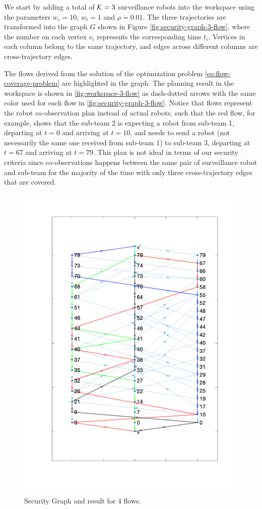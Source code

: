 \documentclass[journal]{IEEEtran}  %
\begin{document}
We start by adding a total of $\mathcal{K}=3$ surveillance robots into the workspace using the parameters $w_{c}=10$, $w_{t}=1$ and $\rho = 0.01$. The three trajectories are transformed into the graph $G$ shown in Figure \ref{fig:security-graph-3-flow}, where the number on each vertex $v_{i}$ represents the corresponding time $t_{i}$. Vertices in each column belong to the same trajectory, and edges across different columns are cross-trajectory edges. 

The flows derived from the solution of the optimization problem \eqref{eq:flow-coverage-problem} are highlighted in the graph. The planning result in the workspace is shown in \ref{fig:workspace-3-flow} as dash-dotted arrows with the same color used for each flow in \ref{fig:security-graph-3-flow}. Notice that flows represent the robot co-observation plan instead of actual robots, such that the red flow, for example, shows that the sub-team 2 is expecting a robot from sub-team 1, departing at $t=0$ and arriving at $t=10$, and needs to send a robot (not necessarily the same one received from sub-team 1) to sub-team 3, departing at $t=67$ and arriving at $t=79$. This plan is not ideal in terms of our security criteria since co-observations happens between the same pair of surveillance robot and sub-team for the majority of the time with only three cross-trajectory edges that are covered.

\begin{figure}[t]
\begin{center}
\includegraphics[width=0.4\linewidth]{graph_flow_result_4}
\caption{Security Graph and result for 4 flows.}
\label{fig:security-graph-4-flow}
\end{center}
\end{figure}
\end{document}
